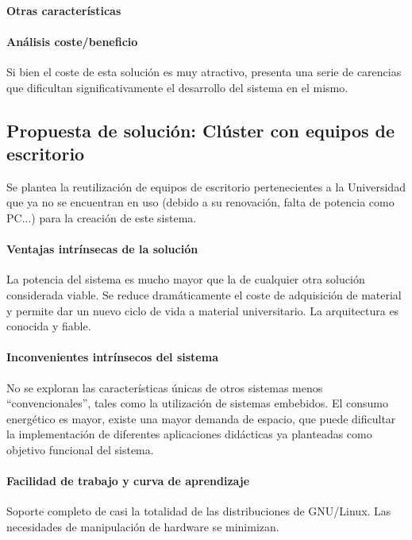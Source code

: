\paragraph{Otras características}

\paragraph{Análisis coste/beneficio}

Si bien el coste de esta solución es muy atractivo, presenta una serie de carencias que dificultan significativamente el desarrollo del sistema en el mismo. 


\subsection{Propuesta de solución: Clúster con equipos de escritorio}

Se plantea la reutilización de equipos de escritorio pertenecientes a la Universidad que ya no se encuentran en uso (debido a su renovación, falta de potencia como PC...) para la creación de este sistema.

\paragraph{Ventajas intrínsecas de la solución}
La potencia del sistema es mucho mayor que la de cualquier otra solución considerada viable. Se reduce dramáticamente el coste de adquisición de material y permite dar un nuevo ciclo de vida a material universitario.
La arquitectura es conocida y fiable.

\paragraph{Inconvenientes intrínsecos del sistema}

No se exploran las características únicas de otros sistemas menos ``convencionales'', tales como la utilización de sistemas embebidos. El consumo energético es mayor, existe una mayor demanda de espacio, que puede dificultar la implementación de diferentes aplicaciones didácticas ya planteadas como objetivo funcional del sistema.

\paragraph{Facilidad de trabajo y curva de aprendizaje}

Soporte completo de casi la totalidad de las distribuciones de GNU/Linux.
Las necesidades de manipulación de hardware se minimizan.

